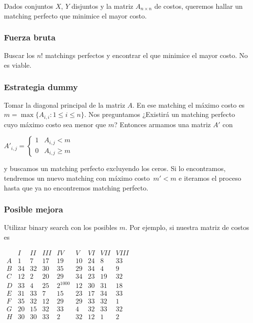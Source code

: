 \documentclass[10pt,a4paper]{article}
\begin{document}
Dados conjuntos $X$, $Y$ disjuntos y la matriz $A_{n\times n}$ de costos, queremos hallar un matching perfecto que minimice el mayor costo.

\subsubsection*{Fuerza bruta}

Buscar los $n!$ matchings perfectos y encontrar el que minimice el mayor costo. No es viable.

\subsubsection*{Estrategia dummy}

Tomar la diagonal principal de la matriz $A$. En ese matching el máximo costo es $m = \max\{A_{i,i} :1\leq i \leq n\}$. Nos preguntamos ¿Existirá un matching perfecto cuyo máximo costo sea menor que $m$? Entonces armamos una matriz $A'$ con

\begin{center}
$A'_{i,j} = \begin{cases} 1 & A_{i,j} < m\\ 0 & A_{i,j} \geq m \end{cases}$
\end{center}

y buscamos un matching perfecto excluyendo los ceros. Si lo encontramos, tendremos un nuevo matching con máximo costo $m' < m$ e iteramos el proceso hasta que ya no encontremos matching perfecto.

\subsubsection*{Posible mejora}

Utilizar binary search con los posibles $m$. Por ejemplo, si nuestra matriz de costos es

\begin{center}
$\begin{array}{c|cccccccc} & I&II&III&IV&V&VI&VII&VIII\\ \hline A&1&7&17&19&10&24&8&33\\ B&34&32&30&35&29&34&4&9\\ C&12&2&20&29&34&23&19&32\\ D&33&4&25&2^{1000}&12&30&31&18\\ E&31&33&7&15&23&17&34&33\\ F&35&32&12&29&29&33&32&1\\ G&20&15&32&33&4&32&33&32\\ H&30&30&33&2&32&12&1&2\\ \end{array}$
\end{center}
\end{document}

